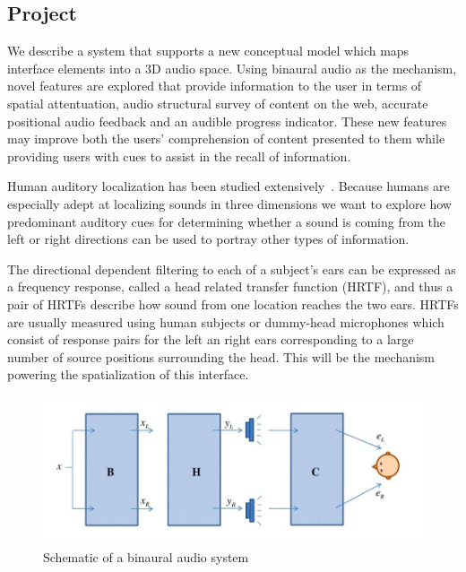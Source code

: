 \subsection{                 Project                                         }

We describe a system that supports a new conceptual model which maps interface
elements into a 3D audio space. Using binaural audio as the mechanism, novel 
features are explored that provide information to the user in terms of spatial
attentuation, audio structural survey of content on the web, accurate positional
audio feedback and an audible progress indicator. These new features may improve
both the users' comprehension of content presented to them while providing users 
with cues to assist in the recall of information.

Human auditory localization has been studied extensively~\cite{
yost1987directional, blauert1997spatial }. Because humans are especially adept
at localizing sounds in three dimensions we want to explore how predominant
auditory cues for determining whether a sound is coming from the left or right
directions can be used to portray other types of information.

The directional dependent filtering to each of a subject's ears can be expressed
as a frequency response, called a head related transfer function (HRTF), and
thus a pair of HRTFs describe how sound from one location reaches the two ears.
HRTFs are usually measured using human subjects or dummy-head microphones which
consist of response pairs for the left an right ears corresponding to a large
number of source positions surrounding the head. This will be the mechanism
powering the spatialization of this interface.

\begin{figure}[h]
  \centering
  \includegraphics[width=1\textwidth]{images/binaural_diagram.jpg}
  \caption{Schematic of a binaural audio system}
\end{figure}

